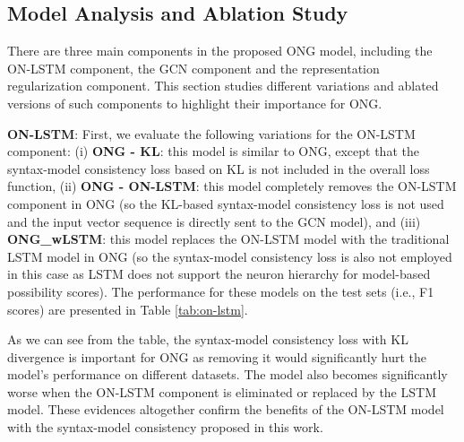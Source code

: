 \documentclass[11pt,a4paper]{article}
\begin{document}
\subsection{Model Analysis and Ablation Study}

There are three main components in the proposed ONG model, including the ON-LSTM component, the GCN component and the representation regularization component. This section studies different variations and ablated versions of such components to highlight their importance for ONG.





{\bf ON-LSTM}: First, we evaluate the following variations for the ON-LSTM component: (i) {\bf ONG - KL}: this model is similar to ONG, except that the syntax-model consistency loss based on KL  is not included in the overall loss function, (ii) {\bf ONG - ON-LSTM}: this model completely removes the ON-LSTM component in ONG (so the KL-based syntax-model consistency loss is not used and the input vector sequence  is directly sent to the GCN model), and (iii) {\bf ONG\_wLSTM}: this model replaces the ON-LSTM model with the traditional LSTM model in ONG (so the syntax-model consistency loss is also not employed in this case as LSTM does not support the neuron hierarchy for model-based possibility scores). The performance for these models on the test sets (i.e., F1 scores) are presented in Table \ref{tab:on-lstm}.

\begin{table}[ht]
\centering
    \caption{Performance of the ON-LSTM's variations.}
    \label{tab:on-lstm}
\end{table}
As we can see from the table, the syntax-model consistency loss with KL divergence is important for ONG as removing it would significantly hurt the model's performance on different datasets. The model also becomes significantly worse when the ON-LSTM component is eliminated or replaced by the LSTM model. These evidences altogether confirm the benefits of the ON-LSTM model with the syntax-model consistency proposed in this work.
\end{document}
